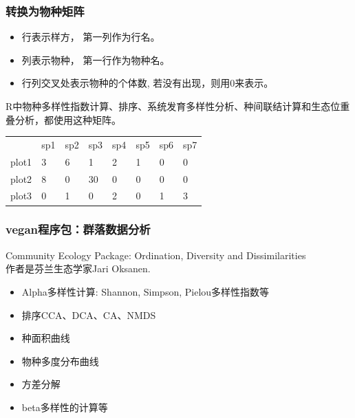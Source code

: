 \documentclass[UTF8]{ctexbeamer}
\begin{document}
\begin{frame}
\frametitle{转换为物种矩阵}
\begin{itemize}
\item 行表示样方， 第一列作为行名。\\
\item 列表示物种， 第一行作为物种名。\\
\item 行列交叉处表示物种的个体数, 若没有出现，则用0来表示。\\
\end{itemize}

R中物种多样性指数计算、排序、系统发育多样性分析、种间联结计算和生态位重叠分析，都使用这种矩阵。\\

\begin{center}
\begin{tabular}{llllllll} 
  & sp1 & sp2 &sp3 &sp4 & sp5 & sp6& sp7\\
  plot1   &   3 &  6  &  1 &  2 &   1 &   0&   0\\
  plot2   &   8 &  0  & 30 &  0 &   0 &   0&   0\\
  plot3   &   0 &  1  &  0 &  2 &   0 &   1&   3\\
\end{tabular}
\end{center}
\end{frame}


\begin{frame}
\frametitle{vegan程序包：群落数据分析}
Community Ecology Package: Ordination, Diversity and Dissimilarities \\
作者是芬兰生态学家Jari Oksanen.\\
\begin{itemize}
\item Alpha多样性计算: Shannon, Simpson, Pielou多样性指数等\\
\item 排序CCA、DCA、CA、NMDS\\
\item 种面积曲线\\
\item 物种多度分布曲线\\
\item 方差分解\\
\item beta多样性的计算等\\
\end{itemize}
\end{frame}
\end{document}
